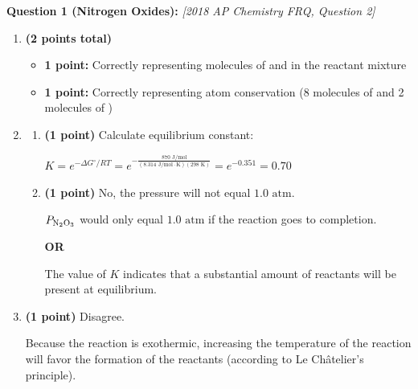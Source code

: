 \documentclass[12pt,letterpaper]{article}
\begin{document}
\noindent \textbf{Question 1 (Nitrogen Oxides):} \textit{[2018 AP Chemistry FRQ, Question 2]}
\begin{enumerate}[label=(\alph*)]
    \item \textbf{(2 points total)}
    \begin{itemize}
        \item \textbf{1 point:} Correctly representing molecules of  and  in the reactant mixture
        \item \textbf{1 point:} Correctly representing atom conservation (8 molecules of  and 2 molecules of )
    \end{itemize}
    
    \item 
    \begin{enumerate}[label=(\roman*)]
        \item \textbf{(1 point)} Calculate equilibrium constant:
        
        $K = e^{-\Delta G^\circ/RT} = e^{-\frac{870\text{ J/mol}}{(8.314\text{ J/mol}\cdot\text{K})(298\text{ K})}} = e^{-0.351} = 0.70$
        
        \item \textbf{(1 point)} No, the pressure will not equal $1.0\text{ atm}$.
        
        $P_{\ce{N2O3}}$ would only equal $1.0\text{ atm}$ if the reaction goes to completion.
        
        \textbf{OR}
        
        The value of $K$ indicates that a substantial amount of reactants will be present at equilibrium.
    \end{enumerate}
    
    \item \textbf{(1 point)} Disagree.
    
    Because the reaction is exothermic, increasing the temperature of the reaction will favor the formation of the reactants (according to Le Ch\^atelier's principle).
\end{enumerate}
\end{document}
